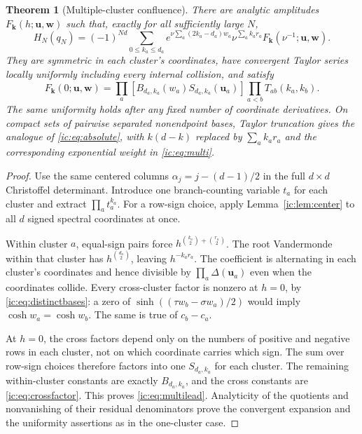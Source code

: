 \documentclass[11pt,a4paper]{article}
\numberwithin{equation}{section}
\newtheorem{theorem}{Theorem}[section]
\theoremstyle{definition}
\theoremstyle{remark}
\newcommand{\bk}{\boldsymbol{k}}
\newcommand{\Del}{\Delta}
\newcommand{\bu}{\boldsymbol u}
\newcommand{\bw}{\boldsymbol w}
\begin{document}
\begin{theorem}[Multiple-cluster confluence]\label{ic:thm:multi}
There are analytic amplitudes $F_{\bk}(h;\bu,\bw)$ such that, exactly for
all sufficiently large $N$,
\begin{equation}\label{ic:eq:multi}
 H_N(q_N)=(-1)^{Nd}\sum_{0\le k_a\le d_a}
 e^{\nu\sum_a(2k_a-d_a)w_a}
 \nu^{\sum_a k_ar_a}F_{\bk}(\nu^{-1};\bu,\bw).
\end{equation}
They are symmetric in each cluster's coordinates, have convergent Taylor
series locally uniformly including every internal collision, and satisfy
\begin{equation}\label{ic:eq:multilead}
 F_{\bk}(0;\bu,\bw)=
 \prod_a\left[B_{d_a,k_a}(w_a)S_{d_a,k_a}(\bu_a)\right]
 \prod_{a<b}T_{ab}(k_a,k_b).
\end{equation}
The same uniformity holds after any fixed number of coordinate
derivatives. On compact sets of pairwise separated nonendpoint bases,
Taylor truncation gives the analogue of \eqref{ic:eq:absolute}, with
$k(d-k)$ replaced by $\sum_a k_ar_a$ and the corresponding exponential
weight in \eqref{ic:eq:multi}.
\end{theorem}
\begin{proof}
Use the same centered columns $\alpha_j=j-(d-1)/2$ in the full
$d\times d$ Christoffel determinant. Introduce one branch-counting
variable $t_a$ for each cluster and extract $\prod_a t_a^{k_a}$.
For a row-sign choice, apply Lemma~\ref{ic:lem:center} to all $d$ signed
spectral coordinates at once.

Within cluster $a$, equal-sign pairs force
$h^{\binom{k_a}2+\binom{r_a}2}$. The root Vandermonde within that cluster
has $h^{\binom{d_a}2}$, leaving $h^{-k_ar_a}$. The coefficient is
alternating in each cluster's coordinates and hence divisible by
$\prod_a\Del(\bu_a)$ even when the coordinates collide. Every cross-cluster
factor is nonzero at $h=0$, by \eqref{ic:eq:distinctbases}: a zero of
$\sinh((\tau w_b-\sigma w_a)/2)$ would imply
$\cosh w_a=\cosh w_b$. The same is true of $c_b-c_a$.

At $h=0$, the cross factors depend only on the numbers of positive and
negative rows in each cluster, not on which coordinate carries which
sign. The sum over row-sign choices therefore factors into one
$S_{d_a,k_a}$ for each cluster. The remaining within-cluster constants
are exactly $B_{d_a,k_a}$, and the cross constants are
\eqref{ic:eq:crossfactor}. This proves \eqref{ic:eq:multilead}. Analyticity of
the quotients and nonvanishing of their residual denominators prove the
convergent expansion and the uniformity assertions as in the one-cluster
case.
\end{proof}
\end{document}
